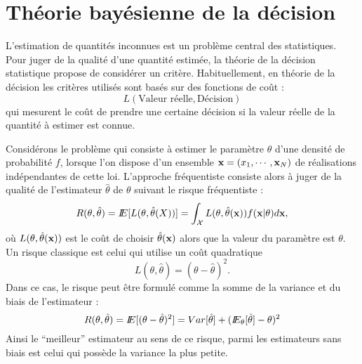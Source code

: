 \chapter{Th\'eorie bay\'esienne de la d\'ecision}
\nocite{Neyman1928}
L'estimation de quantit\'es inconnues est un probl\`eme central
des statistiques. Pour juger de  la qualit\'e d'une
quantit\'e estim\'ee, la th\'eorie de la d\'ecision statistique 
propose de consid\'erer un crit\`ere. Habituellement,
en th\'eorie de la d\'ecision les crit\`eres utilis\'es sont  bas\'es
sur des fonctions de co\^ut :
$$
L(\mbox{Valeur r\'eelle},\mbox{D\'ecision})
$$
qui mesurent le co\^ut de prendre une certaine d\'ecision
si  la valeur r\'eelle de la quantit\'e \`a estimer est connue.   

\begin{ex}
\label{ex:estimation1}
Consid\'erons le  probl\`eme qui consiste \`a estimer le param\`etre
$\theta$ d'une densit\'e de probabilit\'e $f$, lorsque l'on dispose
d'un ensemble $\mbox{\bf x}=(x_1,\cdots,\mbox{\bf x}_N)$ de r\'ealisations ind\'ependantes 
de cette loi.  
L'approche fr\'equentiste consiste alors \`a juger de la qualit\'e de
l'estimateur $\hat{\theta}$ de $\theta$ suivant  le risque fr\'equentiste :
\begin{equation}
R(\theta,\hat{\theta})=I\!\!E[L(\theta,\hat{\theta}(X))]=
\int_{\cal{X}} L(\theta,\hat{\theta}(\mbox{\bf x})) f(\mbox{\bf x}|\theta ) d\mbox{\bf x},
\end{equation} 
o\`u $L(\theta,\hat{\theta}(\mbox{\bf x}))$ est le co\^ut de choisir 
$\hat{\theta}(\mbox{\bf x})$ alors que la valeur du param\`etre est $\theta$.
Un risque classique est celui qui utilise un co\^ut quadratique
\begin{equation}
L(\theta,\hat{\theta})=(\theta-\hat{\theta})^2.
\end{equation}
Dans ce cas, le risque peut \^etre formul\'e comme la somme de la variance
et du biais de l'estimateur :
\begin{equation}
R(\theta,\hat{\theta})=I\!\!E[(\theta-\hat{\theta})^2]=
Var[\hat{\theta}] + (I\!\!E_{\theta}[\hat{\theta}] - \theta)^2
\end{equation}
Ainsi le ``meilleur'' estimateur au sens de ce risque, parmi les estimateurs
sans biais est celui qui poss\`ede  la variance la plus petite. 
\end{ex}

